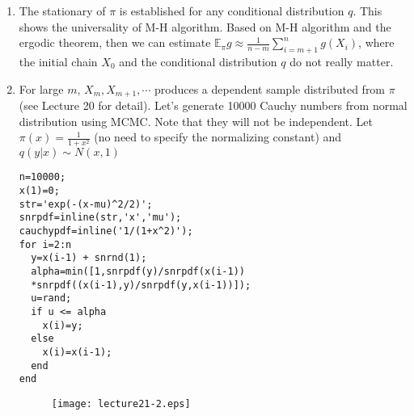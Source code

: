 \documentclass[11pt,twocolumn]{article} %
\begin{document}
\begin{enumerate}
\item The stationary of $\pi$ is established for any conditional distribution $q$. This shows the universality of M-H algorithm. Based on M-H algorithm and the ergodic theorem, then we can estimate $\mathbb{E}_{\pi} g \approx \frac{1}{n-m}\sum_{i=m+1}^n g(X_i)$, where the initial chain $X_0$ and the conditional distribution $q$ do not really matter.

\item For large $m$, $X_m, X_{m+1}, \cdots$ produces a dependent sample distributed from $\pi$ (see Lecture 20 for detail). Let's generate 10000 Cauchy numbers from normal distribution using MCMC. Note that they will not be independent. Let $\pi(x) = \frac{1}{1+x^2}$ (no need to specify the normalizing constant) and $q(y|x) \sim N(x,1)$

\begin{verbatim}
n=10000;
x(1)=0;
str='exp(-(x-mu)^2/2)';
snrpdf=inline(str,'x','mu');
cauchypdf=inline('1/(1+x^2)');
for i=2:n
  y=x(i-1) + snrnd(1);
  alpha=min([1,snrpdf(y)/snrpdf(x(i-1))
  *snrpdf((x(i-1),y)/snrpdf(y,x(i-1))]);
  u=rand;
  if u <= alpha
    x(i)=y;
  else
    x(i)=x(i-1);
  end 
end  
\end{verbatim}
\begin{figure}
\centering
\renewcommand{\baselinestretch}{1}
\texttt{[image: lecture21-2.eps]}
\end{figure}
\end{enumerate} 
\end{document}
